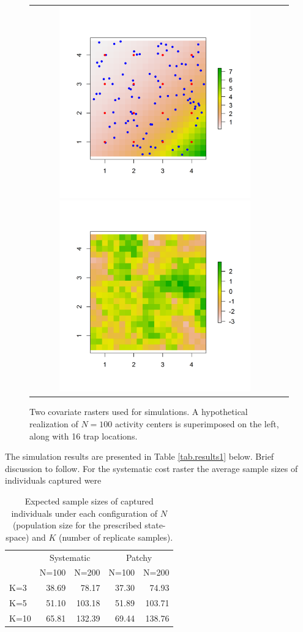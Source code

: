 \documentclass[12pt]{article}
\begin{document}
\begin{figure}
\begin{tabular}{cc}
\includegraphics[height=3.25in,width=3.25in]{figs/raster_withN100}
\includegraphics[height=3.25in,width=3.25in]{figs/raster_krige} &
\end{tabular}
\caption{Two covariate rasters used for simulations. A hypothetical
  realization of $N=100$ activity centers is superimposed on the left,
along with 16 trap locations. }
\label{ecoldist.fig.raster100}
\end{figure}

The simulation results are presented in Table \ref{tab.results1} below. Brief
discussion to follow. 
For the systematic cost raster the average sample sizes of individuals
captured were 
\begin{table}[ht]
\centering
\caption{
Expected sample sizes of captured individuals under each configuration of 
$N$ (population size for the prescribed state-space) and $K$ (number of replicate samples). 
}
\begin{tabular}{l|rrrr}
 & \multicolumn{2}{c}{Systematic} & \multicolumn{2}{c}{Patchy}  \\
    & N=100 &  N=200  &   N=100 &  N=200  \\ \hline
K=3 &  38.69 &   78.17  &   37.30 &   74.93  \\
K=5 &  51.10 &  103.18  &   51.89 &  103.71 \\
K=10&  65.81 &  132.39  &   69.44 &  138.76 \\
\end{tabular}
\label{tab.samplesize}
 \end{table}
\end{document}

